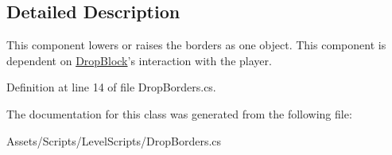 \subsection{Detailed Description}
This component lowers or raises the borders as one object. This component is dependent on \hyperlink{class_drop_block}{Drop\+Block}'s interaction with the player. 



Definition at line 14 of file Drop\+Borders.\+cs.



The documentation for this class was generated from the following file\+:\begin{DoxyCompactItemize}
\item 
Assets/\+Scripts/\+Level\+Scripts/Drop\+Borders.\+cs\end{DoxyCompactItemize}

